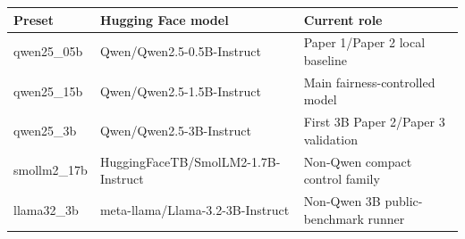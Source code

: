 \begin{tabular}{lll}
\toprule
Preset & Hugging Face model & Current role \\
\midrule
qwen25\_05b & Qwen/Qwen2.5-0.5B-Instruct & Paper 1/Paper 2 local baseline \\
qwen25\_15b & Qwen/Qwen2.5-1.5B-Instruct & Main fairness-controlled model \\
qwen25\_3b & Qwen/Qwen2.5-3B-Instruct & First 3B Paper 2/Paper 3 validation \\
smollm2\_17b & HuggingFaceTB/SmolLM2-1.7B-Instruct & Non-Qwen compact control family \\
llama32\_3b & meta-llama/Llama-3.2-3B-Instruct & Non-Qwen 3B public-benchmark runner \\
\bottomrule
\end{tabular}